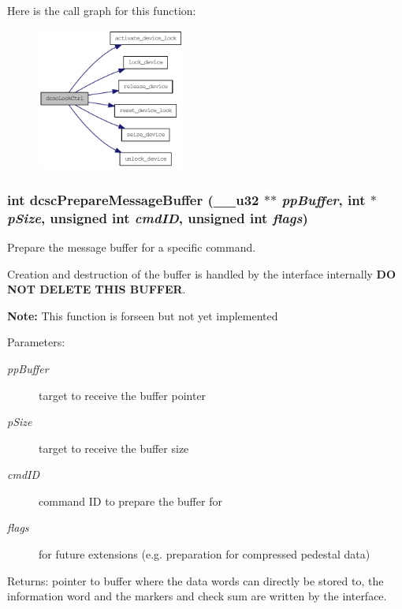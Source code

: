 Here is the call graph for this function:\begin{figure}[H]
\begin{center}
\leavevmode
\includegraphics[width=138pt]{group__dcsc__msg__buffer__access_gb01774a452cb68f631a87d2d77ac79a5_cgraph}
\end{center}
\end{figure}
\hypertarget{group__dcsc__msg__buffer__access_g4f25fcb80c8fad99d5d72f96e72bd941}{
\subsubsection[dcscPrepareMessageBuffer]{\setlength{\rightskip}{0pt plus 5cm}int dcsc\-Prepare\-Message\-Buffer (\_\-\_\-u32 $\ast$$\ast$ {\em pp\-Buffer}, int $\ast$ {\em p\-Size}, unsigned int {\em cmd\-ID}, unsigned int {\em flags})}}
\label{group__dcsc__msg__buffer__access_g4f25fcb80c8fad99d5d72f96e72bd941}


Prepare the message buffer for a specific command. 

Creation and destruction of the buffer is handled by the interface internally {\bf DO NOT DELETE THIS BUFFER}.\par
 {\bf Note:} This function is forseen but not yet implemented \begin{Desc}
\item[Parameters:]
\begin{description}
\item[{\em pp\-Buffer}]target to receive the buffer pointer \item[{\em p\-Size}]target to receive the buffer size \item[{\em cmd\-ID}]command ID to prepare the buffer for \item[{\em flags}]for future extensions (e.g. preparation for compressed pedestal data) \end{description}
\end{Desc}
\begin{Desc}
\item[Returns:]pointer to buffer where the data words can directly be stored to, the information word and the markers and check sum are written by the interface. \end{Desc}


